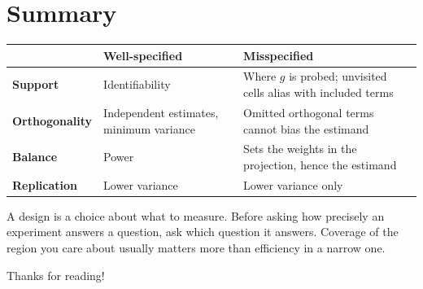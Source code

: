 \documentclass{article}
\begin{document}
\section{Summary}

\begin{tabular}{lll}
\toprule
 & Well-specified & Misspecified \\
\midrule
\textbf{Support} & Identifiability & Where $g$ is probed; unvisited cells alias with included terms \\
\textbf{Orthogonality} & Independent estimates, minimum variance & Omitted orthogonal terms cannot bias the estimand \\
\textbf{Balance} & Power & Sets the weights in the projection, hence the estimand \\
\textbf{Replication} & Lower variance & Lower variance only \\
\bottomrule
\end{tabular}

A design is a choice about what to measure. Before asking how precisely an experiment answers a question, ask which question it answers. Coverage of the region you care about usually matters more than efficiency in a narrow one.

Thanks for reading!
\end{document}
